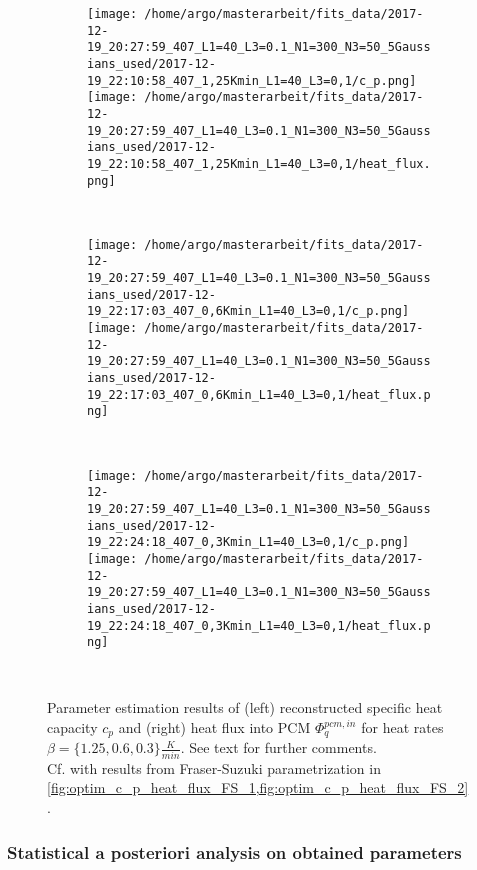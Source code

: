 \documentclass{scrartcl}[12pt, halfparskip]
\numberwithin{equation}{section}
\numberwithin{figure}{section}
\numberwithin{table}{section}
\begin{document}
\begin{figure}[H]
	\begin{subfigure}{1.\textwidth}
		\texttt{[image: /home/argo/masterarbeit/fits\_data/2017-12-19\_20:27:59\_407\_L1=40\_L3=0.1\_N1=300\_N3=50\_5Gaussians\_used/2017-12-19\_22:10:58\_407\_1,25Kmin\_L1=40\_L3=0,1/c\_p.png]}
		\texttt{[image: /home/argo/masterarbeit/fits\_data/2017-12-19\_20:27:59\_407\_L1=40\_L3=0.1\_N1=300\_N3=50\_5Gaussians\_used/2017-12-19\_22:10:58\_407\_1,25Kmin\_L1=40\_L3=0,1/heat\_flux.png]}
	\end{subfigure} \\[1ex]
	
	
	\begin{subfigure}{1.\textwidth}
		\texttt{[image: /home/argo/masterarbeit/fits\_data/2017-12-19\_20:27:59\_407\_L1=40\_L3=0.1\_N1=300\_N3=50\_5Gaussians\_used/2017-12-19\_22:17:03\_407\_0,6Kmin\_L1=40\_L3=0,1/c\_p.png]}
		\texttt{[image: /home/argo/masterarbeit/fits\_data/2017-12-19\_20:27:59\_407\_L1=40\_L3=0.1\_N1=300\_N3=50\_5Gaussians\_used/2017-12-19\_22:17:03\_407\_0,6Kmin\_L1=40\_L3=0,1/heat\_flux.png]}
	\end{subfigure} \\[1ex]
	
	
	\begin{subfigure}{1.\textwidth}
		\texttt{[image: /home/argo/masterarbeit/fits\_data/2017-12-19\_20:27:59\_407\_L1=40\_L3=0.1\_N1=300\_N3=50\_5Gaussians\_used/2017-12-19\_22:24:18\_407\_0,3Kmin\_L1=40\_L3=0,1/c\_p.png]}
		\texttt{[image: /home/argo/masterarbeit/fits\_data/2017-12-19\_20:27:59\_407\_L1=40\_L3=0.1\_N1=300\_N3=50\_5Gaussians\_used/2017-12-19\_22:24:18\_407\_0,3Kmin\_L1=40\_L3=0,1/heat\_flux.png]}
	\end{subfigure} \\[1ex]
	\caption{Parameter estimation results of (left) reconstructed specific heat capacity $c_p$ and (right) heat flux into PCM $\varPhi_q^{pcm,in}$ for heat rates $\beta=\{ 1.25, 0.6, 0.3 \} \frac{K}{min}$. See text for further comments. \\
	Cf. with results from Fraser-Suzuki parametrization in \cref{fig:optim_c_p_heat_flux_FS_1,fig:optim_c_p_heat_flux_FS_2}.}
	\label{fig:optim_c_p_heat_flux_5Gaussians_2}
\end{figure}

\subsubsection{Statistical a posteriori analysis on obtained parameters}
\end{document}
